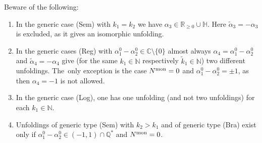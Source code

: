 \documentclass[10pt,a4paper]{amsart}
\numberwithin{equation}{section}
\numberwithin{figure}{section}
\newcommand{\N}{{\mathbb N}}
\newcommand{\Q}{{\mathbb Q}}
\newcommand{\C}{{\mathbb C}}
\newcommand{\R}{{\mathbb R}}
\renewcommand{\H}{{\mathbb H}}
\newcommand{\www}{\widetilde}
\begin{document}
\begin{Remark}%
Beware of the following:

\begin{enumerate}\itemsep=0pt
\item[$(i)$] In the generic case (Sem) with $k_1=k_2$ we have
$\alpha_3\in\R_{\geq 0}\cup\H$. Here $\www\alpha_3=-\alpha_3$
is excluded, as it gives an isomorphic unfolding.

\item[$(ii)$] In the generic cases (Reg) with
$\alpha_1^0-\alpha_2^0\in\C\setminus\{0\}$ almost always
$\alpha_4=\alpha_1^0-\alpha_2^0$ and $\www\alpha_4=-\alpha_4$
give (for the same $k_1\in\N$ respectively $\www k_1\in\N$)
two different unfoldings.
The~only exception is the case $N^{\rm mon}=0$ and
$\alpha_1^0-\alpha_2^0=\pm 1$, as then $\alpha_4=-1$
is not allowed.

\item[$(iii)$] In the generic case (Log), one has
one unfolding (and not two unfoldings) for each $k_1\in\N$.

\item[$(iv)$] Unfoldings of generic type (Sem) with $k_2>k_1$ and of
generic type (Bra) exist only if
$\alpha_1^0-\alpha_2^0\in (-1,1)\cap\Q^*$ and $N^{\rm mon}=0$.
\end{enumerate}
\end{Remark}
\end{document}

